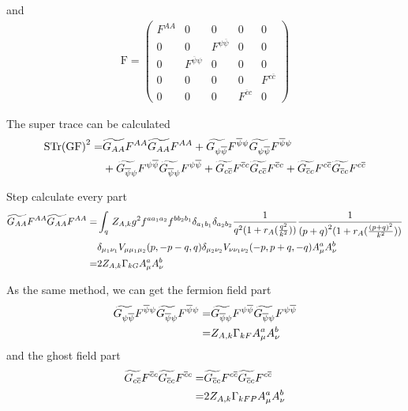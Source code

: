 \documentclass[UTF8]{ctexart}
\begin{document}
and
\begin{gather}
\mathrm{F}=\begin{pmatrix}F^{AA}&0&0&0&0\\0&0&F^{\psi\overline{\psi}}&0&0\\0&F^{\overline{\psi}\psi}&0&0&0\\0&0&0&0&F^{c\overline{c}}\\0&0&0&F^{\overline{c}c}&0\end{pmatrix}
\end{gather}
\par The super trace can be calculated
\begin{align}
\mathrm{STr}{(\mathrm{GF})}^2=&\widetilde{G_{AA}}F^{AA}\widetilde{G_{AA}}F^{AA}+\widetilde{G_{\psi\overline{\psi}}}F^{\overline{\psi}\psi}\widetilde{G_{\psi\overline{\psi}}}F^{\overline{\psi}\psi}
\notag\\&+\widetilde{G_{\overline{\psi}\psi}}F^{\psi\overline{\psi}}\widetilde{G_{\overline{\psi}\psi}}F^{\psi\overline{\psi}}+\widetilde{G_{c\overline{c}}}F^{\overline{c}c}\widetilde{G_{c\overline{c}}}F^{\overline{c}c}+\widetilde{G_{\overline{c}c}}F^{c\overline{c}}\widetilde{G_{\overline{c}c}}F^{c\overline{c}}
\end{align}
\par Step calculate every part
\begin{align}
\widetilde{G_{AA}}F^{AA}\widetilde{G_{AA}}F^{AA}=&\int_{q}\,Z_{A,k}g^{2}f^{a a_1 a_2}f^{b b_2 b_1}\delta_{a_1 b_1}\delta_{a_2 b_2}\frac{1}{q^{2}(1+r_{A}(\frac{q^2}{k^2}))}\frac{1}{{(p+q)}^{2}(1+r_{A}(\frac{{(p+q)}^2}{k^2}))}
\notag\\&\delta_{\mu_1 \nu_1}V_{\mu \mu_1 \mu_2}(p,-p-q,q)\delta_{\mu_2 \nu_2}V_{\nu \nu_1 \nu_2}(-p,p+q,-q)A_{\mu}^{a}A_{\nu}^{b}
\notag\\=&2Z_{A,k}\Gamma_{kG}A_{\mu}^{a}A_{\nu}^{b}
\end{align}
\par As the same method, we can get the fermion field part
\begin{align}
\widetilde{G_{\psi\overline{\psi}}}F^{\overline{\psi}\psi}\widetilde{G_{\overline{\psi}\psi}}F^{\overline{\psi}\psi}=&\widetilde{G_{\overline{\psi}\psi}}F^{\psi\overline{\psi}}\widetilde{G_{\overline{\psi}\psi}}F^{\psi\overline{\psi}}
\notag\\=&Z_{A,k}\Gamma_{kF}A_{\mu}^{a}A_{\nu}^{b}
\end{align}
and the ghost field part
\begin{align}
\widetilde{G_{c\overline{c}}}F^{\overline{c}c}\widetilde{G_{\overline{c}c}}F^{\overline{c}c}=&\widetilde{G_{\overline{c}c}}F^{c\overline{c}}\widetilde{G_{\overline{c}c}}F^{c\overline{c}}
\notag\\=&2Z_{A,k}\Gamma_{kFP}A_{\mu}^{a}A_{\nu}^{b}
\end{align}
\end{document}
